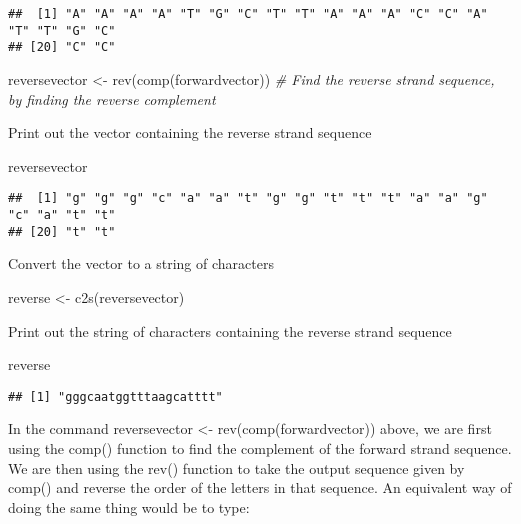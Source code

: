 \documentclass[
]{book}
\newenvironment{Shaded}{\begin{snugshade}}{\end{snugshade}}
\newcommand{\CommentTok}[1]{\textcolor[rgb]{0.56,0.35,0.01}{\textit{#1}}}
\newcommand{\FunctionTok}[1]{\textcolor[rgb]{0.00,0.00,0.00}{#1}}
\newcommand{\NormalTok}[1]{#1}
\newcommand{\OtherTok}[1]{\textcolor[rgb]{0.56,0.35,0.01}{#1}}
\begin{document}
\begin{verbatim}
##  [1] "A" "A" "A" "A" "T" "G" "C" "T" "T" "A" "A" "A" "C" "C" "A" "T" "T" "G" "C"
## [20] "C" "C"
\end{verbatim}

\begin{Shaded}
\begin{Highlighting}[]
\NormalTok{reversevector }\OtherTok{\textless{}{-}} \FunctionTok{rev}\NormalTok{(}\FunctionTok{comp}\NormalTok{(forwardvector))    }\CommentTok{\# Find the reverse strand sequence, by finding the reverse complement}
\end{Highlighting}
\end{Shaded}

Print out the vector containing the reverse strand sequence

\begin{Shaded}
\begin{Highlighting}[]
\NormalTok{reversevector                             }
\end{Highlighting}
\end{Shaded}

\begin{verbatim}
##  [1] "g" "g" "g" "c" "a" "a" "t" "g" "g" "t" "t" "t" "a" "a" "g" "c" "a" "t" "t"
## [20] "t" "t"
\end{verbatim}

Convert the vector to a string of characters

\begin{Shaded}
\begin{Highlighting}[]
\NormalTok{reverse }\OtherTok{\textless{}{-}} \FunctionTok{c2s}\NormalTok{(reversevector)                }
\end{Highlighting}
\end{Shaded}

Print out the string of characters containing the reverse strand sequence

\begin{Shaded}
\begin{Highlighting}[]
\NormalTok{reverse                                      }
\end{Highlighting}
\end{Shaded}

\begin{verbatim}
## [1] "gggcaatggtttaagcatttt"
\end{verbatim}

In the command reversevector \textless- rev(comp(forwardvector)) above, we are first using the comp() function to find the complement of the forward strand sequence. We are then using the rev() function to take the output sequence given by comp() and reverse the order of the letters in that sequence. An equivalent way of doing the same thing would be to type:
\end{document}
